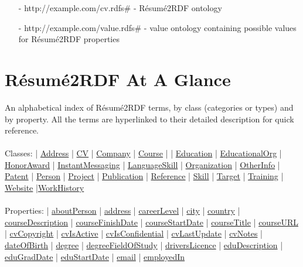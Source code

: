 \documentclass[a4paper,12pt]{article}
\numberwithin{equation}{section}
\begin{document}
\begin{itemize}
\item[-] http://example.com/cv.rdfs\# - R{\'e}sum{\'e}2RDF ontology
\item[-] http://example.com/value.rdfs\# - value ontology containing possible values for R{\'e}sum{\'e}2RDF properties
\end{itemize}

\section{R{\'e}sum{\'e}2RDF At A Glance}\label{rdf2resumeataglance}
An alphabetical index of R{\'e}sum{\'e}2RDF terms, by class (categories or types) and by property. All the terms are hyperlinked to their detailed description for quick reference. 
\\\\
Classes:  | \hyperlink{Address}{Address} | \hyperlink{CV}{CV} |  \hyperlink{Company}{Company} | \hyperlink{Course}{Course} | |
\hyperlink{Education}{Education} | \hyperlink{EducationalOrg}{EducationalOrg} |
\hyperlink{HonorAward}{HonorAward} |
\hyperlink{InstantMessaging}{InstantMessaging} |  \hyperlink{LanguageSkill}{LanguageSkill} |  \hyperlink{Organization}{Organization}  | \hyperlink{OtherInfo}{OtherInfo} |
\hyperlink{Patent}{Patent} | \hyperlink{Person}{Person} |
\hyperlink{Project}{Project} |
\hyperlink{Publication}{Publication} |
\hyperlink{Reference}{Reference} | \hyperlink{Skill}{Skill}  | \hyperlink{Target}{Target}  | \hyperlink{Training}{Training} |
\hyperlink{Website}{Website} |\hyperlink{WorkHistory}{WorkHistory}
\\\\
Properties: | \hyperlink{aboutPerson}{aboutPerson} | \hyperlink{address}{address} | \hyperlink{careerLevel}{careerLevel} |  \hyperlink{city}{city} |    \hyperlink{country}{country} | \hyperlink{courseDescription}{courseDescription} | \hyperlink{courseFinishDate}{courseFinishDate} | \hyperlink{courseStartDate}{courseStartDate} | \hyperlink{courseTitle}{courseTitle} | \hyperlink{courseURL}{courseURL} | \hyperlink{cvCopyright}{cvCopyright} | \hyperlink{cvIsActive}{cvIsActive} | \hyperlink{cvIsConfidential}{cvIsConfidential} | \hyperlink{cvLastUpdate}{cvLastUpdate} | \hyperlink{cvNotes}{cvNotes} |  \hyperlink{dateOfBirth}{dateOfBirth} | \hyperlink{degree}{degree} |
\hyperlink{degreeFieldOfStudy}{degreeFieldOfStudy} |
\hyperlink{driversLicence}{driversLicence} | \hyperlink{eduDescription}{eduDescription} | \hyperlink{eduGradDate}{eduGradDate} |  \hyperlink{eduStartDate}{eduStartDate} | \hyperlink{email}{email} | \hyperlink{employedIn}{employedIn} 
\end{document}
